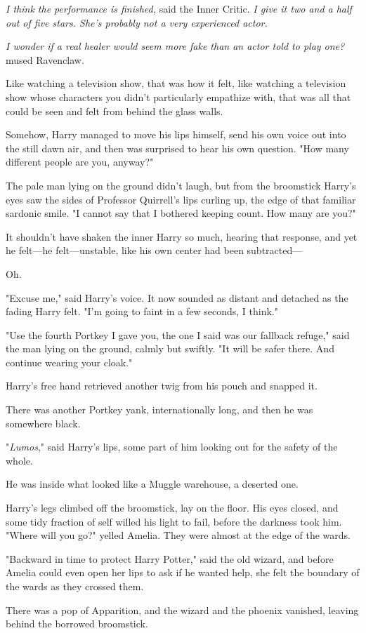 \emph{I think the performance is finished,} said the Inner Critic. \emph{I give
it two and a half out of five stars. She's probably not a very experienced
actor.}

\emph{I wonder if a real healer would seem more fake than an actor told to play
one?} mused Ravenclaw.

Like watching a television show, that was how it felt, like watching a
television show whose characters you didn't particularly empathize with, that
was all that could be seen and felt from behind the glass walls.

Somehow, Harry managed to move his lips himself, send his own voice out into
the still dawn air, and then was surprised to hear his own question. "How many
different people are you, anyway?"

The pale man lying on the ground didn't laugh, but from the broomstick Harry's
eyes saw the sides of Professor Quirrell's lips curling up, the edge of that
familiar sardonic smile. "I cannot say that I bothered keeping count. How many
are you?"

It shouldn't have shaken the inner Harry so much, hearing that response, and
yet he felt---he felt---unstable, like his own center had been subtracted---

Oh.

"Excuse me," said Harry's voice. It now sounded as distant and detached as the
fading Harry felt. "I'm going to faint in a few seconds, I think."

"Use the fourth Portkey I gave you, the one I said was our fallback refuge,"
said the man lying on the ground, calmly but swiftly. "It will be safer there.
And continue wearing your cloak."

Harry's free hand retrieved another twig from his pouch and snapped it.

There was another Portkey yank, internationally long, and then he was somewhere
black.

"\emph{Lumos}," said Harry's lips, some part of him looking out for the safety
of the whole.

He was inside what looked like a Muggle warehouse, a deserted one.

Harry's legs climbed off the broomstick, lay on the floor. His eyes closed, and
some tidy fraction of self willed his light to fail, before the darkness took
him.
\sbreak
"Where will you go?" yelled Amelia. They were almost at the edge of the wards.

"Backward in time to protect Harry Potter," said the old wizard, and before
Amelia could even open her lips to ask if he wanted help, she felt the boundary
of the wards as they crossed them.

There was a pop of Apparition, and the wizard and the phoenix vanished, leaving
behind the borrowed broomstick.
